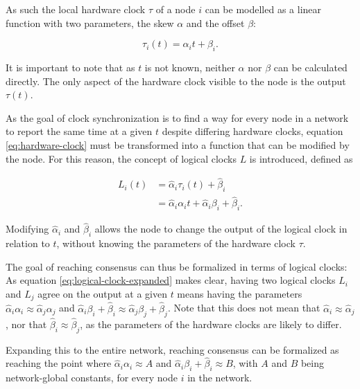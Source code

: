 \documentclass[a4paper,12pt]{article}
\begin{document}
As such the local hardware clock $\tau$ of a node $i$ can be modelled as a linear function with two parameters, the skew $\alpha$ and the offset $\beta$:


\begin{equation}\label{eq:hardware-clock}
    \tau_i(t) = \alpha_i t + \beta_i.
\end{equation}

It is important to note that as $t$ is not known, neither $\alpha$ nor $\beta$ can be calculated directly. The only aspect of the hardware clock visible to the node is the output $\tau(t)$.

As the goal of clock synchronization is to find a way for every node in a network to report the same time at a given $t$ despite differing hardware clocks, equation \ref{eq:hardware-clock} must be transformed into a function that can be modified by the node. For this reason, the concept of logical clocks $L$ is introduced, defined as

\begin{align}
    L_i(t) &= \hat\alpha_i \tau_i(t) + \hat\beta_i \nonumber \\
        &= \hat\alpha_i \alpha_i t + \hat\alpha_i \beta_i + \hat\beta_i. \label{eq:logical-clock-expanded}
\end{align}

Modifying $\hat\alpha_i$ and $\hat\beta_i$ allows the node to change the output of the logical clock in relation to $t$, without knowing the parameters of the hardware clock $\tau$.

The goal of reaching consensus can thus be formalized in terms of logical clocks: As equation \ref{eq:logical-clock-expanded} makes clear, having two logical clocks $L_i$ and $L_j$ agree on the output at a given $t$ means having the parameters $\hat\alpha_i \alpha_i \approx \hat\alpha_j \alpha_j$ and $\hat\alpha_i \beta_i + \hat\beta_i \approx \hat\alpha_j \beta_j + \hat\beta_j$. Note that this does not mean that $\hat\alpha_i \approx \hat\alpha_j$, nor that $\hat\beta_i \approx \hat\beta_j$, as the parameters of the hardware clocks are likely to differ.

Expanding this to the entire network, reaching consensus can be formalized as reaching the point where $\hat\alpha_i \alpha_i \approx A$ and $\hat\alpha_i \beta_i + \hat\beta_i \approx B$, with $A$ and $B$ being network-global constants, for every node $i$ in the network.

\end{document}
